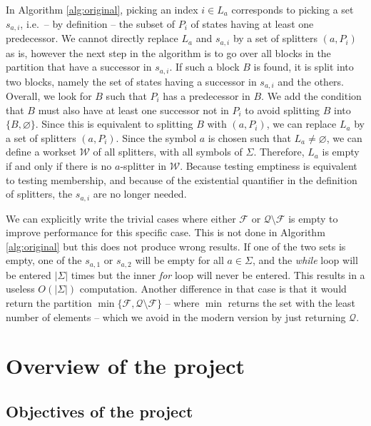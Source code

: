 \documentclass[12pt, a4 paper]{article}
\theoremstyle{definition}
\begin{document}
In Algorithm \ref{alg:original}, picking an index $i \in L_a$ corresponds to picking a set $s_{a, i}$, i.e.\ -- by definition -- the subset of $P_i$ of states having at least one predecessor.
We cannot directly replace $L_a$ and $s_{a, i}$ by a set of splitters $(a, P_i)$ as is, however the next step in the algorithm is to go over all blocks in the partition that have a successor in $s_{a, i}$.
If such a block $B$ is found, it is split into two blocks, namely the set of states having a successor in $s_{a, i}$ and the others.
Overall, we look for $B$ such that $P_i$ has a predecessor in $B$. We add the condition that $B$ must also have at least one successor not in $P_i$ to avoid splitting $B$ into $\{B, \varnothing\}$.
Since this is equivalent to splitting $B$ with $(a, P_i)$, we can replace $L_a$ by a set of splitters $(a, P_i)$.
Since the symbol $a$ is chosen such that $L_a \neq \varnothing$, we can define a workset $\mathcal{W}$ of all splitters, with all symbols of $\Sigma$. Therefore, $L_a$ is empty if and only if there is no $a$-splitter in $\mathcal{W}$.
Because testing emptiness is equivalent to testing membership, and because of the existential quantifier in the definition of splitters, the $s_{a, i}$ are no longer needed.

We can explicitly write the trivial cases where either $\mathcal{F}$ or $\mathcal{Q}\setminus\mathcal{F}$ is empty to improve performance for this specific case.
This is not done in Algorithm \ref{alg:original} but this does not produce wrong results.
If one of the two sets is empty, one of the $s_{a, 1}$ or $s_{a, 2}$ will be empty for all $a \in \Sigma$, and the \textit{while} loop will be entered $|\Sigma|$ times but the inner \textit{for} loop will never be entered.
This results in a useless $O(|\Sigma|)$ computation.
Another difference in that case is that it would return the partition $\min\{\mathcal{F}, \mathcal{Q}\setminus\mathcal{F}\}$ -- where $\min$ returns the set with the least number of elements --  which we avoid in the modern version by just returning $\mathcal{Q}$.

\section{Overview of the project}

\subsection{Objectives of the project}
\end{document}
